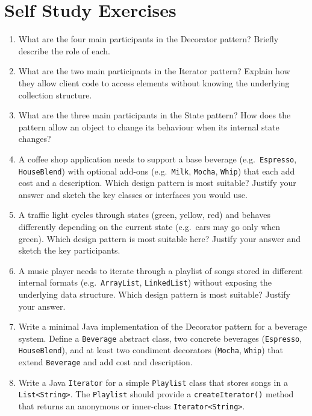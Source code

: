 \documentclass[twoside=false,DIV=14]{scrartcl}
\begin{document}
\section*{Self Study Exercises}
\begin{enumerate}
\item What are the four main participants in the Decorator pattern?  Briefly describe the role of each.

\item What are the two main participants in the Iterator pattern?  Explain how they allow client code to access elements without knowing the underlying collection structure.

\item What are the three main participants in the State pattern?  How does the pattern allow an object to change its behaviour when its internal state changes?

\item A coffee shop application needs to support a base beverage (e.g.\ \texttt{Espresso}, \texttt{HouseBlend}) with optional add-ons (e.g.\ \texttt{Milk}, \texttt{Mocha}, \texttt{Whip}) that each add cost and a description.  Which design pattern is most suitable?  Justify your answer and sketch the key classes or interfaces you would use.

\item A traffic light cycles through states (green, yellow, red) and behaves differently depending on the current state (e.g.\ cars may go only when green).  Which design pattern is most suitable here?  Justify your answer and sketch the key participants.

\item A music player needs to iterate through a playlist of songs stored in different internal formats (e.g.\ \texttt{ArrayList}, \texttt{LinkedList}) without exposing the underlying data structure.  Which design pattern is most suitable?  Justify your answer.

\item Write a minimal Java implementation of the Decorator pattern for a beverage system.  Define a \texttt{Beverage} abstract class, two concrete beverages (\texttt{Espresso}, \texttt{HouseBlend}), and at least two condiment decorators (\texttt{Mocha}, \texttt{Whip}) that extend \texttt{Beverage} and add cost and description.

\item Write a Java \texttt{Iterator} for a simple \texttt{Playlist} class that stores songs in a \texttt{List<String>}.  The \texttt{Playlist} should provide a \texttt{createIterator()} method that returns an anonymous or inner-class \texttt{Iterator<String>}.


\end{enumerate}
\end{document}
